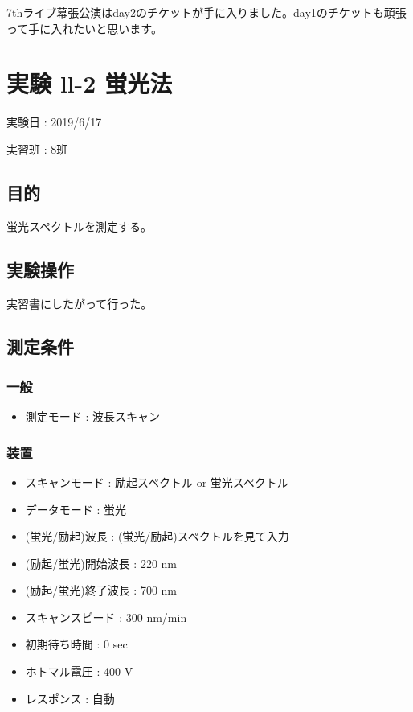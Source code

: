 \documentclass[a4paper,papersize,dvipdfmx]{jsarticle}
\begin{document}
7thライブ幕張公演はday2のチケットが手に入りました。day1のチケットも頑張って手に入れたいと思います。

\newpage

\section*{実験 ll-2 蛍光法}
\begin{flushright}
実験日 : 2019/6/17

実習班 : 8班
\end{flushright}

\subsection*{目的}

蛍光スペクトルを測定する。

\subsection*{実験操作}
実習書にしたがって行った。

\subsection*{測定条件}
\subsubsection*{一般}
\begin{itemize}
\item 測定モード : 波長スキャン
\end{itemize}
\subsubsection*{装置}
\begin{itemize}
\item スキャンモード : 励起スペクトル or 蛍光スペクトル
\item データモード : 蛍光
\item (蛍光/励起)波長 : (蛍光/励起)スペクトルを見て入力
\item (励起/蛍光)開始波長 : 220 nm
\item (励起/蛍光)終了波長 : 700 nm
\item スキャンスピード : 300 nm/min
\item 初期待ち時間 : 0 sec
\item ホトマル電圧 : 400 V
\item レスポンス : 自動

\end{itemize}
\end{document}
